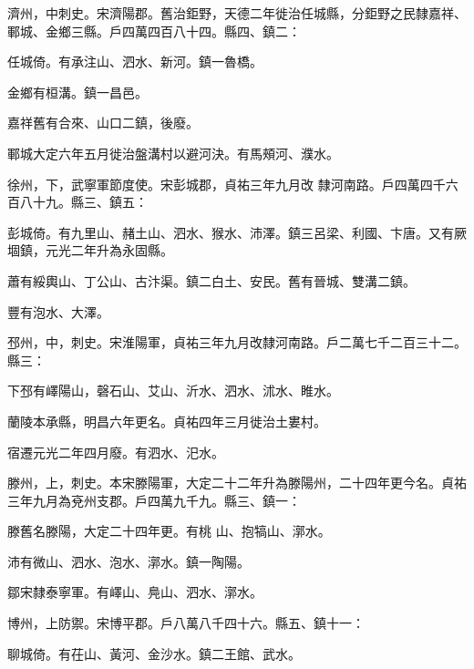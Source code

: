 \begin{pinyinscope}
 濟州，中刺史。宋濟陽郡。舊治鉅野，天德二年徙治任城縣，分鉅野之民隸嘉祥、鄆城、金鄉三縣。戶四萬四百八十四。縣四、鎮二：



 任城倚。有承注山、泗水、新河。鎮一魯橋。



 金鄉有桓溝。鎮一昌邑。



 嘉祥舊有合來、山口二鎮，後廢。



 鄆城大定六年五月徙治盤溝村以避河決。有馬頰河、濮水。



 徐州，下，武寧軍節度使。宋彭城郡，貞祐三年九月改
 隸河南路。戶四萬四千六百八十九。縣三、鎮五：



 彭城倚。有九里山、赭土山、泗水、猴水、沛澤。鎮三呂梁、利國、卞唐。又有厥堌鎮，元光二年升為永固縣。



 蕭有綏輿山、丁公山、古汴渠。鎮二白土、安民。舊有晉城、雙溝二鎮。



 豐有泡水、大澤。



 邳州，中，刺史。宋淮陽軍，貞祐三年九月改隸河南路。戶二萬七千二百三十二。縣三：



 下邳有嶧陽山，磬石山、艾山、沂水、泗水、沭水、睢水。



 蘭陵本承縣，明昌六年更名。貞祐四年三月徙治土婁村。



 宿遷元光二年四月廢。有泗水、汜水。



 滕州，上，刺史。本宋滕陽軍，大定二十二年升為滕陽州，二十四年更今名。貞祐三年九月為兗州支郡。戶四萬九千九。縣三、鎮一：



 滕舊名滕陽，大定二十四年更。有桃
 山、抱犒山、漷水。



 沛有微山、泗水、泡水、漷水。鎮一陶陽。



 鄒宋隸泰寧軍。有嶧山、鳧山、泗水、漷水。



 博州，上防禦。宋博平郡。戶八萬八千四十六。縣五、鎮十一：



 聊城倚。有茌山、黃河、金沙水。鎮二王館、武水。




\end{pinyinscope}
